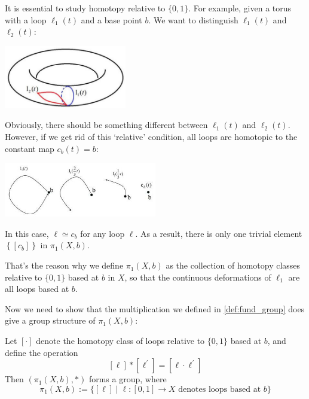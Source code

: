 It is essential to study homotopy relative to \(\{ 0,1\}\). For example, given a torus with a loop \({\ell }_{1}\left( t\right)\) and a base point \(b\). We want to distinguish \({\ell }_{1}\left( t\right)\) and \({\ell }_{2}\left( t\right)\):
\begin{center}
\includegraphics[width=0.4\textwidth]{images/Ch7_2_loops_on_T.jpg}
\end{center}
Obviously, there should be something different between \({\ell }_{1}\left( t\right)\) and \({\ell }_{2}\left( t\right)\). However, if we get rid of this `relative' condition, all loops are homotopic to the constant map \({c}_{b}\left( t\right)  = b\):
\begin{center}
\includegraphics[width=0.5\textwidth]{images/Ch7_homotopic_to_constant.jpg}
\end{center}
In this case, \(\ell  \simeq  {c}_{b}\) for any loop \(\ell\). As a result, there is only one trivial element \(\left\{  \left\lbrack  {c}_{b}\right\rbrack  \right\}\) in \({\pi }_{1}\left( {X,b}\right)\).

That’s the reason why we define \({\pi }_{1}\left( {X,b}\right)\) as the collection of homotopy classes relative to \(\{ 0,1\}\) based at \(b\) in \(X\), so that the continuous deformations of $\ell_1$ are all loops based at $b$.

Now we need to show that the multiplication we defined in \autoref{def:fund_group} does give a group structure of $\pi_1(X,b)$:
\begin{theorem} \label{thm:pi1_forms_a_group} Let \(\left\lbrack  \cdot \right\rbrack\) denote the homotopy class of loops relative to \(\{ 0,1\}\) based at \(b\), and define the operation
\[
\left\lbrack  \ell \right\rbrack   * \left\lbrack  {\ell }^{\prime }\right\rbrack   = \left\lbrack  {\ell  \cdot  {\ell }^{\prime }}\right\rbrack
\]
Then \(\left( {{\pi }_{1}\left( {X,b}\right), * }\right)\) forms a group, where
\[
{\pi }_{1}\left( {X,b}\right)  \mathrel{\text{ := }} \{ \left\lbrack  \ell \right\rbrack   \mid  \ell  : \left\lbrack  {0,1}\right\rbrack   \rightarrow  X\text{ denotes loops based at }b\}
\]
\end{theorem}

